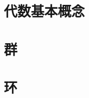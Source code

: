 \documentclass[b5paper]{book}
\begin{document}
\allowdisplaybreaks
\tableofcontents
\raggedbottom

\chapter{代数基本概念}


\chapter{群}


\chapter{环}

\end{document}
